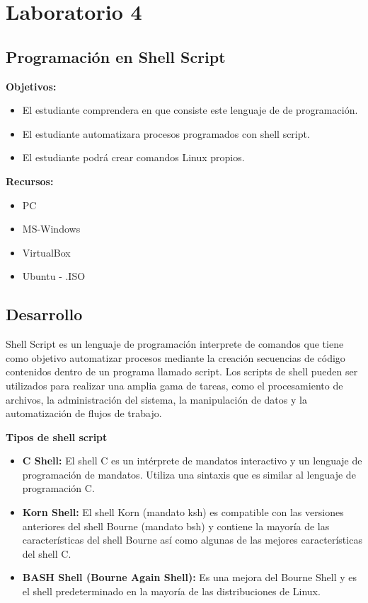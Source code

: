 \documentclass[11pt,twoside]{book}
\begin{document}
\section{ Laboratorio 4}
\subsection{Programación en Shell Script}

\textbf{Objetivos:}
\begin{itemize}
  \item   El estudiante comprendera en que consiste este lenguaje de de programación.
  \item El estudiante automatizara procesos programados con shell script.  
  \item El estudiante podrá crear comandos Linux propios.
\end{itemize}

\textbf{Recursos:}
\begin{itemize}
  \item PC
  \item MS-Windows
  \item VirtualBox
  \item Ubuntu - .ISO
\end{itemize}

\subsection*{Desarrollo}
Shell Script es un lenguaje de programación interprete de comandos que tiene como objetivo automatizar procesos mediante la creación secuencias de código contenidos dentro de un programa llamado script. Los scripts de shell pueden ser utilizados para realizar una amplia gama de tareas, como el procesamiento de archivos, la administración del sistema, la manipulación de datos y la automatización de flujos de trabajo.

\vspace{10pt}

\textbf{Tipos de shell script}
\begin{itemize}
  \item\textbf{C Shell: }El shell C es un intérprete de mandatos interactivo y un lenguaje de programación de mandatos. Utiliza una sintaxis que es similar al lenguaje de programación C.
  \item\textbf{Korn Shell: }El shell Korn (mandato ksh) es compatible con las versiones anteriores del shell Bourne (mandato bsh) y contiene la mayoría de las características del shell Bourne así como algunas de las mejores características del shell C.
  \item\textbf{BASH Shell (Bourne Again Shell): } Es una mejora del Bourne Shell y es el shell predeterminado en la mayoría de las distribuciones de Linux.
\end{itemize}
\end{document}
